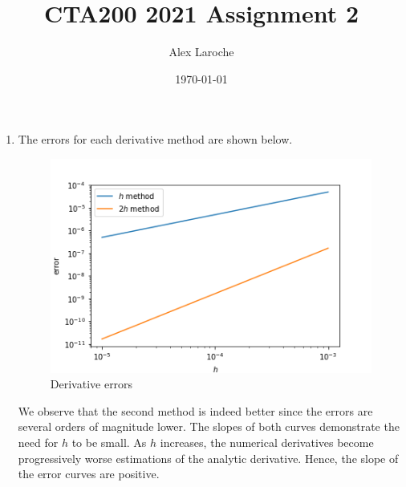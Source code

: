\documentclass{article}
\title{CTA200 2021 Assignment 2}
\author{Alex Laroche}
\date{\today}
\begin{document}
\maketitle

\begin{enumerate}

\item The errors for each derivative method are shown below.
\begin{figure}[htb!]
    \centering
    \includegraphics[scale=0.7]{deriv_err.png}
    \caption{Derivative errors}
    \label{fig:deriv}
\end{figure}

We observe that the second method is indeed better since the errors are several orders of magnitude lower. The slopes of both curves demonstrate the need for $h$ to be small. As $h$ increases, the numerical derivatives become progressively worse estimations of the analytic derivative. Hence, the slope of the error curves are positive.

\newpage


\end{enumerate}
\end{document}
